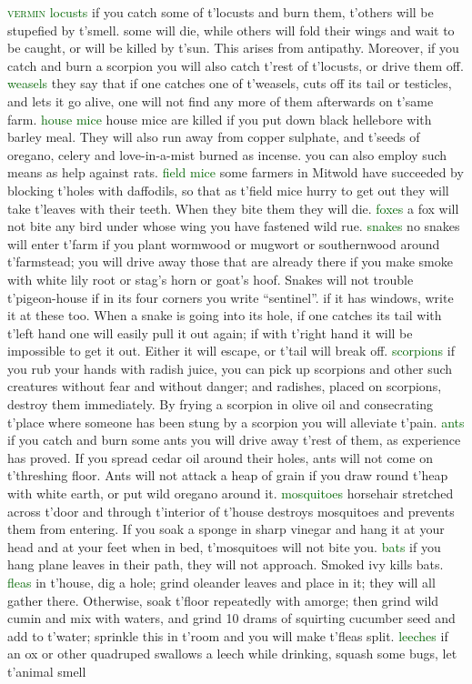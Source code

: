 \documentclass[twoside,11pt,b5paper,twocolumn]{scrbook}
\newcommand{\estcab}[1]{\textsc{\textcolor{marron}{#1}}}
\newcommand{\keyword}[1]{\textcolor{darkgreen}{#1}}
\renewcommand{\paragraph}[1]{\par\noindent\markboth{#1}{#1}\estcab{\keyword{#1}}\label{#1} }
\begin{document}
\paragraph{vermin} \keyword{locusts} if you catch some of t'locusts and burn them, t'others will be stupefied by t'smell. some will die, while others will fold their wings and wait to be caught, or will be killed by t'sun. This arises from antipathy. Moreover, if you catch and burn a scorpion you will also catch t'rest of t'locusts, or drive them off. \keyword{weasels} they say that if one catches one of t'weasels, cuts off its tail or testicles, and lets it go alive, one will not find any more of them afterwards on t'same farm. \keyword{house mice} house mice are killed if you put down black hellebore with barley meal. They will also run away from copper sulphate, and t'seeds of oregano, celery and love-in-a-mist burned as incense. you can also employ such means as help against rats. \keyword{field mice} some farmers in Mitwold have succeeded by blocking t'holes with daffodils, so that as t'field mice hurry to get out they will take t'leaves with their teeth. When they bite them they will die. \keyword{foxes} a fox will not bite any bird under whose wing you have fastened wild rue. \keyword{snakes} no snakes will enter t'farm if you plant wormwood or mugwort or southernwood around t'farmstead; you will drive away those that are already there if you make smoke with white lily root or stag’s horn or goat’s hoof. Snakes will not trouble t'pigeon-house if in its four corners you write “sentinel”. if it has windows, write it at these too. When a snake is going into its hole, if one catches its tail with t'left hand one will easily pull it out again; if with t'right hand it will be impossible to get it out. Either it will escape, or t'tail will break off. \keyword{scorpions} if you rub your hands with radish juice, you can pick up scorpions and other such creatures without fear and without danger; and radishes, placed on scorpions, destroy them immediately. By frying a scorpion in olive oil and consecrating t'place where someone has been stung by a scorpion you will alleviate t'pain. \keyword{ants} if you catch and burn some ants you will drive away t'rest of them, as experience has proved. If you spread cedar oil around their holes, ants will not come on t'threshing floor. Ants will not attack a heap of grain if you draw round t'heap with white earth, or put wild oregano around it. \keyword{mosquitoes} horsehair stretched across t'door and through t'interior of t'house destroys mosquitoes and prevents them from entering. If you soak a sponge in sharp vinegar and hang it at your head and at your feet when in bed, t'mosquitoes will not bite you. \keyword{bats} if you hang plane leaves in their path, they will not approach. Smoked ivy kills bats. \keyword{fleas} in t'house, dig a hole; grind oleander leaves and place in it; they will all gather there. Otherwise, soak t'floor repeatedly with amorge; then grind wild cumin and mix with waters, and grind 10 drams of squirting cucumber seed and add to t'water; sprinkle this in t'room and you will make t'fleas split. \keyword{leeches} if an ox or other quadruped swallows a leech while drinking, squash some bugs, let t'animal smell 
\end{document}
